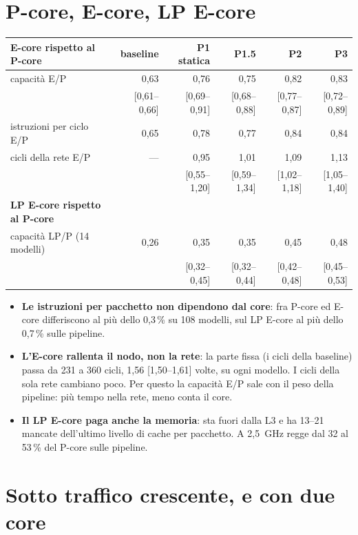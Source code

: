 \documentclass[11pt,a4paper,oneside]{report}
\begin{document}
\section{P-core, E-core, LP E-core}

\begin{center}
\small
\begin{tabular}{@{}lrrrrr@{}}
\toprule
\textbf{E-core rispetto al P-core} & \textbf{baseline} & \textbf{P1 statica} & \textbf{P1.5} & \textbf{P2} & \textbf{P3} \\
\midrule
capacità E/P & 0,63 & 0,76 & 0,75 & 0,82 & 0,83 \\
 & [0,61--0,66] & [0,69--0,91] & [0,68--0,88] & [0,77--0,87] & [0,72--0,89] \\
istruzioni per ciclo E/P & 0,65 & 0,78 & 0,77 & 0,84 & 0,84 \\
cicli della rete E/P & --- & 0,95 & 1,01 & 1,09 & 1,13 \\
 & & [0,55--1,20] & [0,59--1,34] & [1,02--1,18] & [1,05--1,40] \\
\midrule
\textbf{LP E-core rispetto al P-core} & & & & & \\
capacità LP/P (14 modelli) & 0,26 & 0,35 & 0,35 & 0,45 & 0,48 \\
 & & [0,32--0,45] & [0,32--0,44] & [0,42--0,48] & [0,45--0,53] \\
\bottomrule
\end{tabular}
\end{center}

\begin{itemize}
  \item \textbf{Le istruzioni per pacchetto non dipendono dal core}: fra P-core ed
        E-core differiscono al più dello 0,3\,\% su 108 modelli, sul LP E-core al
        più dello 0,7\,\% sulle pipeline.
  \item \textbf{L'E-core rallenta il nodo, non la rete}: la parte fissa (i cicli
        della baseline) passa da 231 a 360 cicli, 1,56 [1,50--1,61] volte, su ogni
        modello. I cicli della sola rete cambiano poco. Per questo la capacità
        E/P sale con il peso della pipeline: più tempo nella rete, meno conta il
        core.
  \item \textbf{Il LP E-core paga anche la memoria}: sta fuori dalla L3 e ha
        13--21 mancate dell'ultimo livello di cache per pacchetto. A 2,5~GHz
        regge dal 32 al 53\,\% del P-core sulle pipeline.
\end{itemize}

\section{Sotto traffico crescente, e con due core}
\end{document}
